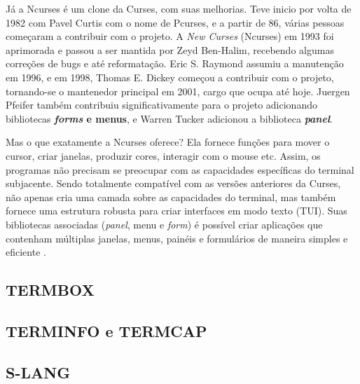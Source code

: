 Já a Ncurses é um clone da Curses, com suas melhorias. Teve inicio por volta de 1982 com Pavel Curtis com o nome de Pcurses,
e a partir de 86, várias pessoas começaram a contribuir com o projeto. A \textit{New Curses}
(Ncurses) em 1993 foi aprimorada e passou a ser mantida por Zeyd Ben-Halim, recebendo
algumas correções de bugs e até reformatação. Eric S. Raymond assumiu a manutenção em 1996,
e em 1998, Thomas E. Dickey começou a contribuir com o projeto, tornando-se o mantenedor principal
em 2001, cargo que ocupa até hoje. Juergen Pfeifer também contribuiu significativamente para o projeto
adicionando bibliotecas \textbf{\textit{forms} e menus}, e Warren Tucker adicionou a biblioteca \textbf{\textit{panel}}.
\cite{ncurses_site}

Mas o que exatamente a Ncurses oferece? Ela fornece funções para mover o cursor, criar janelas, produzir cores, interagir
com o mouse etc. Assim, os programas não precisam se preocupar com as capacidades específicas do terminal subjacente.
Sendo totalmente compatível com as versões anteriores da Curses, não apenas cria uma camada sobre as capacidades do terminal,
mas também fornece uma estrutura robusta para criar interfaces em modo texto (TUI). Suas bibliotecas associadas (\textit{panel},
menu e \textit{form}) é possível criar aplicações que contenham múltiplas janelas, menus, painéis e formulários de
maneira simples e eficiente \cite{ncurses_howto}.

\subsection{TERMBOX}

\subsection{TERMINFO e TERMCAP}

\subsection{S-LANG}
